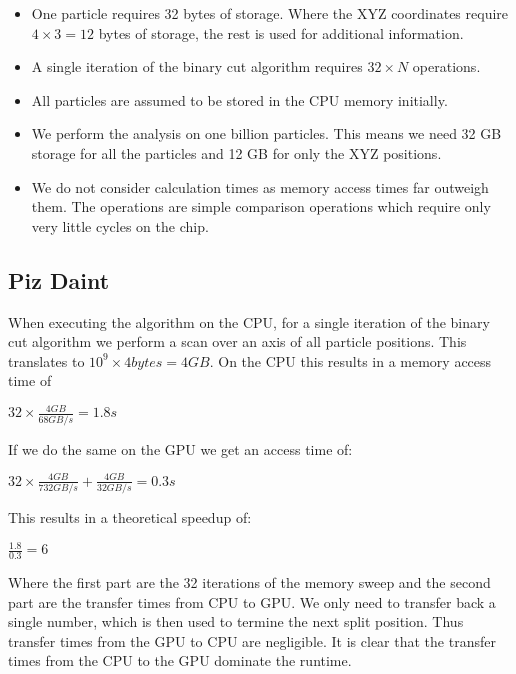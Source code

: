 \documentclass[]{article}
\begin{document}
\begin{itemize}
	\item 
	One particle requires 32 bytes of storage. Where the XYZ coordinates require $4\times3 = 12$ bytes of storage, the rest is used for additional information.
	
	\item
	A single iteration of the binary cut algorithm requires $32 \times N$ operations.
	
	\item 
	All particles are assumed to be stored in the CPU memory initially.
	
	\item
	We perform the analysis on one billion particles. This means we need 32 GB storage for all the particles and 12 GB for only the XYZ positions.
	
	\item
	We do not consider calculation times as memory access times far outweigh them. The operations are simple comparison operations which require only very little cycles on the chip. 
\end{itemize}


\subsection{Piz Daint} 
When executing the algorithm on the CPU, for a single iteration of the binary cut algorithm we perform a scan over an axis of all particle positions. This translates to $10^9 \times 4 bytes = 4 GB$.
On the CPU this results in a memory access time of 
\begin{center}
	$32 \times \frac{ 4 GB}{68 GB/s} = 1.8 s$ 
\end{center}

If we do the same on the GPU we get an access time of:
\begin{center}
	$32 \times \frac{4 GB}{732 GB/s} + \frac{4 GB}{32 GB/s} = 0.3 s$ 
\end{center}

This results in a theoretical speedup of:

\begin{center}
	$\frac{1.8}{0.3} = 6$
\end{center}

Where the first part are the 32 iterations of the memory sweep and the second part are the transfer times from CPU to GPU. We only need to transfer back a single number, which is then used to termine the next split position. Thus transfer times from the GPU to CPU are negligible. It is clear that the transfer times from the CPU to the GPU dominate the runtime.
\end{document}
